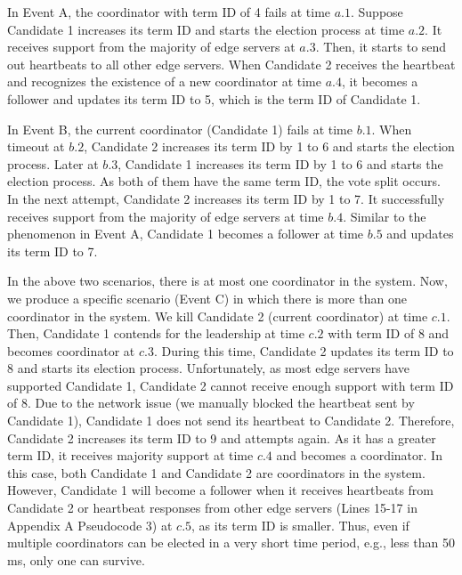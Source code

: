 \documentclass[10pt,journal,compsoc]{IEEEtran}
\begin{document}
In Event A, the coordinator with term ID of 4 fails at time $a.1$. Suppose  Candidate 1 increases its term ID and starts the election process at time $a.2$. It receives support from the majority of edge servers at $a.3$. Then, it starts to send out heartbeats to all other edge servers. When Candidate 2 receives the heartbeat and recognizes the existence of a new coordinator at time $a.4$, it becomes a follower and updates its term ID to 5, which is the term ID of Candidate 1.
 
In Event B, the current coordinator (Candidate 1) fails at time $b.1$. When timeout at $b.2$, Candidate 2 increases its term ID by 1 to 6 and starts the election process. Later at $b.3$, Candidate 1 increases its term ID by 1 to 6 and starts the election process. As both of them have the same term ID, the vote split occurs. In the next attempt, Candidate 2 increases its term ID by 1 to 7. It successfully receives support from the majority of edge servers at time $b.4$. Similar to the phenomenon in Event A, Candidate 1 becomes a follower at time $b.5$ and updates its term ID to 7. 

In the above two scenarios, there is at most one coordinator in the system. Now, we produce a specific scenario (Event C) in which there is more than one coordinator in the system. We kill Candidate 2 (current coordinator) at time $c.1$. Then, Candidate 1 contends for the leadership at time $c.2$ with term ID of 8 and becomes coordinator at $c.3$. During this time, Candidate 2 updates its term ID to 8 and starts its election process. Unfortunately, as most edge servers have supported Candidate 1, Candidate 2 cannot receive enough support with term ID of 8. Due to the network issue (we manually blocked the heartbeat sent by Candidate 1), Candidate 1 does not send its heartbeat to Candidate 2. Therefore, Candidate 2 increases its term ID to 9 and attempts again. As it has a greater term ID, it receives majority support at time $c.4$ and becomes a coordinator. In this case, both Candidate 1 and Candidate 2 are coordinators in the system. However, Candidate 1 will become a follower when it receives heartbeats from Candidate 2 or heartbeat responses from other edge servers (Lines 15-17 in Appendix A Pseudocode 3) at $c.5$, as its term ID is smaller. Thus, even if multiple coordinators can be elected in a very short time period, e.g., less than 50 ms, only one can survive.


\end{document}
